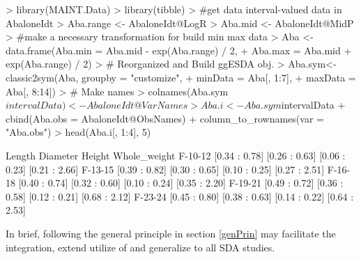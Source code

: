 \documentclass[article]{jss}
\begin{document}
\begin{Schunk}
\begin{Sinput}
> library(MAINT.Data)
> library(tibble)
> #get data interval-valued data in AbaloneIdt
> Aba.range <- AbaloneIdt@LogR
> Aba.mid <- AbaloneIdt@MidP
> #make a necessary transformation for build min max data
> Aba <- data.frame(Aba.min = Aba.mid - exp(Aba.range) / 2,
+                   Aba.max = Aba.mid + exp(Aba.range) / 2)
> # Reorganized and Build ggESDA obj.
> Aba.sym<- classic2sym(Aba, groupby = "customize",
+                       minData = Aba[, 1:7],
+                       maxData = Aba[, 8:14])
> # Make names
> colnames(Aba.sym$intervalData) <- AbaloneIdt@VarNames
> Aba.i <- Aba.sym$intervalData %
+   cbind(Aba.obs = AbaloneIdt@ObsNames) %
+   column_to_rownames(var = "Aba.obs")
> head(Aba.i[, 1:4], 5)
\end{Sinput}
\begin{Soutput}
               Length      Diameter        Height  Whole_weight
F-10-12 [0.34 : 0.78] [0.26 : 0.63] [0.06 : 0.23] [0.21 : 2.66]
F-13-15 [0.39 : 0.82] [0.30 : 0.65] [0.10 : 0.25] [0.27 : 2.51]
F-16-18 [0.40 : 0.74] [0.32 : 0.60] [0.10 : 0.24] [0.35 : 2.20]
F-19-21 [0.49 : 0.72] [0.36 : 0.58] [0.12 : 0.21] [0.68 : 2.12]
F-23-24 [0.45 : 0.80] [0.38 : 0.63] [0.14 : 0.22] [0.64 : 2.53]
\end{Soutput}
\end{Schunk}

In brief, following the general principle in section \ref{genPrin} may facilitate the integration, extend utilize of  and generalize to all SDA studies.




\end{document}
